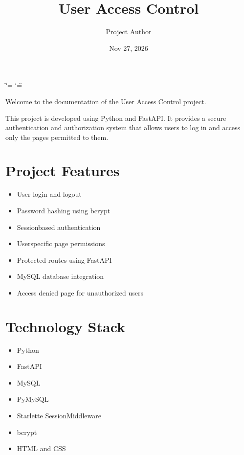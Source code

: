 \documentclass[letterpaper,10pt,english]{sphinxmanual}
\title{User Access Control}
\date{Nov 27, 2026}
\author{Project Author}
\begin{document}
\ifdefined\shorthandoff
  \ifnum\catcode`\=\string=\active\shorthandoff{=}\fi
  \ifnum\catcode`\"=\active{}\fi
\fi

\pagestyle{empty}
\sphinxmaketitle
\pagestyle{plain}
\sphinxtableofcontents
\pagestyle{normal}
\label{\detokenize{index::doc}}


\sphinxAtStartPar
Welcome to the documentation of the User Access Control project.

\sphinxAtStartPar
This project is developed using Python and FastAPI. It provides a secure
authentication and authorization system that allows users to log in and
access only the pages permitted to them.


\chapter{Project Features}
\label{\detokenize{index:project-features}}\begin{itemize}
\item {} 
\sphinxAtStartPar
User login and logout

\item {} 
\sphinxAtStartPar
Password hashing using bcrypt

\item {} 
\sphinxAtStartPar
Session\sphinxhyphen{}based authentication

\item {} 
\sphinxAtStartPar
User\sphinxhyphen{}specific page permissions

\item {} 
\sphinxAtStartPar
Protected routes using FastAPI

\item {} 
\sphinxAtStartPar
MySQL database integration

\item {} 
\sphinxAtStartPar
Access denied page for unauthorized users

\end{itemize}


\chapter{Technology Stack}
\label{\detokenize{index:technology-stack}}\begin{itemize}
\item {} 
\sphinxAtStartPar
Python

\item {} 
\sphinxAtStartPar
FastAPI

\item {} 
\sphinxAtStartPar
MySQL

\item {} 
\sphinxAtStartPar
PyMySQL

\item {} 
\sphinxAtStartPar
Starlette SessionMiddleware

\item {} 
\sphinxAtStartPar
bcrypt

\item {} 
\sphinxAtStartPar
HTML and CSS

\end{itemize}
\end{document}
